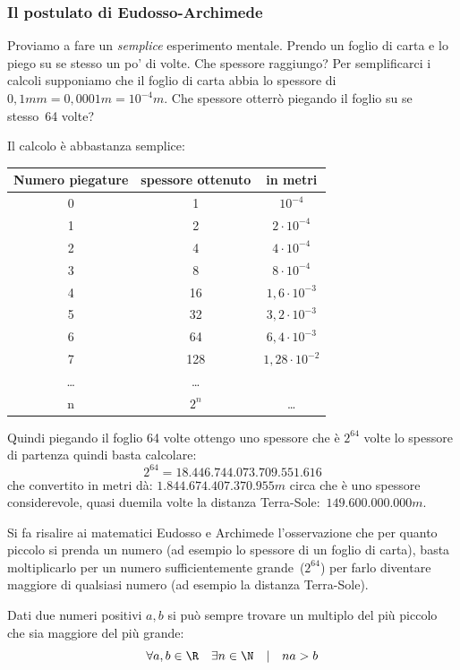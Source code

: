 \subsubsection{Il postulato di Eudosso-Archimede}

Proviamo a fare un \emph{semplice} esperimento mentale. Prendo un foglio di 
carta e lo piego su se stesso un po' di volte. Che spessore raggiungo?
Per semplificarci i calcoli supponiamo che il foglio di carta abbia lo 
spessore di \(0,1mm = 0,0001m = 10^{-4}m\). 
Che spessore otterrò piegando il foglio su se stesso~64 volte?

Il calcolo è abbastanza semplice:

\begin{center}
 \begin{tabular}{ccc}
\toprule
Numero piegature & spessore ottenuto & in metri\\
\midrule
0 & 1 & \(10^{-4}\)\\
1 & 2 & \(2 \cdot 10^{-4}\)\\
2 & 4 & \(4 \cdot 10^{-4}\)\\
3 & 8 & \(8 \cdot 10^{-4}\)\\
4 & 16 & \(1,6 \cdot 10^{-3}\)\\
5 & 32 & \(3,2 \cdot 10^{-3}\)\\
6 & 64 & \(6,4 \cdot 10^{-3}\)\\
7 & 128 & \(1,28 \cdot 10^{-2}\)\\
\ldots& \ldots\\
n & \(2^n\) & \ldots\\
\bottomrule
\end{tabular}
\end{center}

Quindi piegando il foglio 64 volte ottengo uno spessore che è \(2^{64}\) 
volte lo spessore di partenza quindi basta calcolare:
\[2^{64} = 18.446.744.073.709.551.616\]
che convertito in metri dà: \(1.844.674.407.370.955m\) circa che è uno 
spessore considerevole, quasi duemila volte la distanza 
Terra-Sole:~\(149.600.000.000m\).

Si fa risalire ai matematici Eudosso e Archimede l'osservazione che per 
quanto piccolo si prenda un numero (ad esempio lo spessore di un foglio di 
carta), basta moltiplicarlo per un numero sufficientemente 
grande~(\(2^{64}\)) 
per farlo diventare maggiore di qualsiasi numero (ad esempio la distanza 
Terra-Sole).

\begin{postulato}
Dati due numeri positivi \(a, b\) si può sempre trovare un 
multiplo del più piccolo che sia maggiore del più grande:
\[\forall a, b \in \R \quad \exists n \in \N \quad | \quad na>b\]
\end{postulato}

